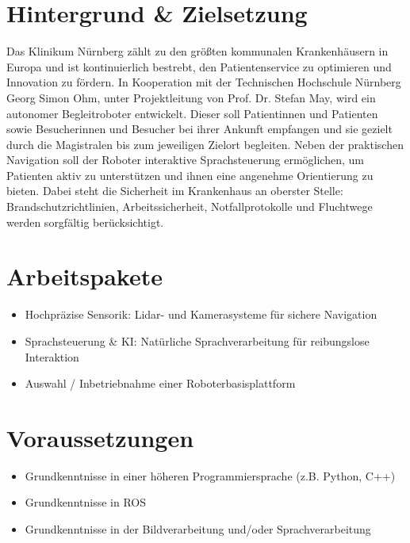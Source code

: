 \documentclass{ohm_project_description}
\begin{document}
\maketitle
\thispagestyle{fancy}



\section*{Hintergrund \& Zielsetzung}
Das Klinikum Nürnberg zählt zu den größten kommunalen Krankenhäusern in Europa und ist kontinuierlich bestrebt, den Patientenservice zu optimieren und Innovation zu fördern. In Kooperation mit der Technischen Hochschule Nürnberg Georg Simon Ohm, unter Projektleitung von Prof. Dr. Stefan May, wird ein autonomer Begleitroboter entwickelt. Dieser soll Patientinnen und Patienten sowie Besucherinnen und Besucher bei ihrer Ankunft empfangen und sie gezielt durch die Magistralen bis zum jeweiligen Zielort begleiten. Neben der praktischen Navigation soll der Roboter interaktive Sprachsteuerung ermöglichen, um Patienten aktiv zu unterstützen und ihnen eine angenehme Orientierung zu bieten. Dabei steht die Sicherheit im Krankenhaus an oberster Stelle: Brandschutzrichtlinien, Arbeitssicherheit, Notfallprotokolle und Fluchtwege werden sorgfältig berücksichtigt.


\section*{Arbeitspakete}
\begin{itemize}[leftmargin=0.5cm]
    \item Hochpräzise Sensorik: Lidar- und Kamerasysteme für sichere Navigation
    \item Sprachsteuerung \& KI: Natürliche Sprachverarbeitung für reibungslose Interaktion
    \item Auswahl / Inbetriebnahme einer Roboterbasisplattform
\end{itemize}

\section*{Voraussetzungen}
\begin{itemize}[leftmargin=0.5cm]
    \item Grundkenntnisse in einer höheren Programmiersprache (z.B. Python, C++)
    \item Grundkenntnisse in ROS 
    \item Grundkenntnisse in der Bildverarbeitung und/oder Sprachverarbeitung
\end{itemize}
\end{document}
